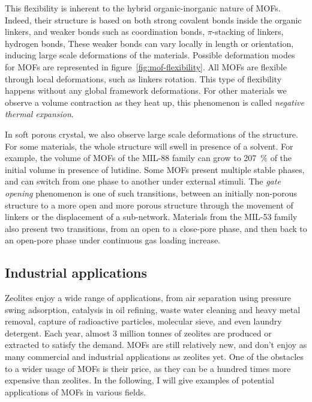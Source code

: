 \documentclass[thesis]{subfiles}
\begin{document}
This flexibility is inherent to the hybrid organic-inorganic nature of MOFs.
Indeed, their structure is based on both strong covalent bonds inside the
organic linkers, and weaker bonds such as coordination bonds, $\pi$-stacking of
linkers, hydrogen bonds, \etc These weaker bonds can vary locally in length or
orientation, inducing large scale deformations of the materials. Possible
deformation modes for MOFs are represented in figure~\ref{fig:mof-flexibility}.
All MOFs are flexible through local deformations, such as linkers rotation. This
type of flexibility happens without any global framework deformations. For other
materials we observe a volume contraction as they heat up, this phenomenon is
called \emph{negative thermal expansion}\cite{Dubbeldam2007}.

In soft porous crystal, we also observe large scale deformations of the
structure. For some materials, the whole structure will swell in presence of a
solvent. For example, the volume of MOFs of the MIL-88 family can grow to 207~\%
of the initial volume in presence of lutidine\cite{Serre2007}. Some MOFs present
multiple stable phases, and can switch from one phase to another under external
stimuli. The \emph{gate opening} phenomenon is one of such transitions, between
an initially non-porous structure to a more open and more porous structure
through the movement of linkers or the displacement of a sub-network. Materials
from the MIL-53 family also present two transitions, from an open to a
close-pore phase, and then back to an open-pore phase\cite{Serre2002} under
continuous gas loading increase.

\subsection{Industrial applications}

Zeolites enjoy a wide range of applications, from air separation using pressure
swing adsorption\cite{Rege1997}, catalysis in oil refining\cite{Primo2014},
waste water cleaning and heavy metal removal\cite{Curkovi1997}, capture of
radioactive particles\cite{Borai2009}, molecular sieve\cite{Flanigen1978}, and
even laundry detergent\cite{Karge1989}. Each year, almost 3 million tonnes of
zeolites are produced or extracted to satisfy the demand. MOFs are still
relatively new, and don't enjoy as many commercial and industrial applications
as zeolites yet. One of the obstacles to a wider usage of MOFs is their price,
as they can be a hundred times more expensive than zeolites. In the following, I
will give examples of potential applications of MOFs in various fields.
\end{document}
